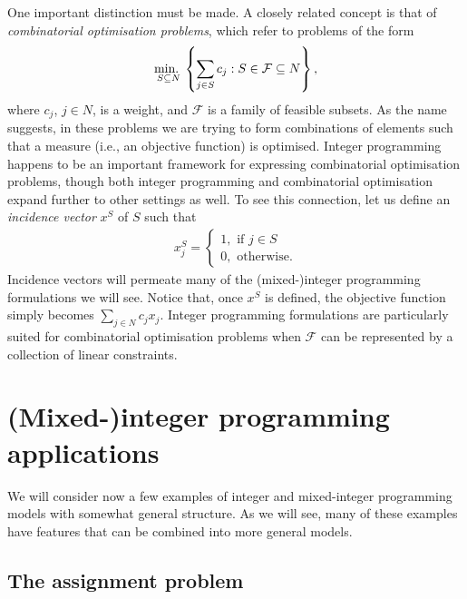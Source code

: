 One important distinction must be made. A closely related concept is that of \emph{combinatorial optimisation problems}, which refer to problems of the form
%
\begin{align*}
 	\mathop{\text{min.~}}_{S \subseteq N} \left\{ \sum_{j \in S} c_j : S \in \mathcal{F} \subseteq N \right \},
\end{align*}
%
where $c_j$, $j \in N$, is a weight, and $\mathcal{F}$ is a family of feasible subsets. As the name suggests, in these problems we are trying to form combinations of elements such that a measure (i.e., an objective function) is optimised. Integer programming happens to be an important framework for expressing combinatorial optimisation problems, though both integer programming and combinatorial optimisation expand further to other settings as well. To see this connection, let us define an \emph{incidence vector} $x^S$ of $S$ such that
%
  \begin{align*}
	  x^S_j = \begin{cases}
	       1, \text{ if } j \in S \\ 
	       0, \text{ otherwise}.
	     \end{cases}
  \end{align*}
%
Incidence vectors will permeate many of the (mixed-)integer programming formulations we will see. Notice that, once $x^S$ is defined, the objective function simply becomes $\sum_{j \in N} c_j x_j$. Integer programming formulations are particularly suited for combinatorial optimisation problems when $\mathcal{F}$ can be represented by a collection of linear constraints. 


\section{(Mixed-)integer programming applications}

We will consider now a few examples of integer and mixed-integer programming models with somewhat general structure. As we will see, many of these examples have features that can be combined into more general models.


\subsection{The assignment problem}


